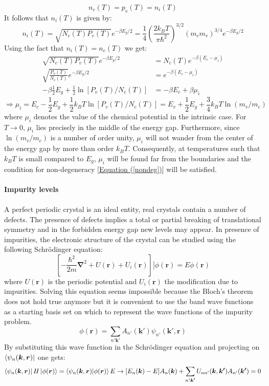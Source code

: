 \documentclass[10.75pt,a4paper,openright,bottom=2cm]{article}
\renewcommand{\Vec}[1]{\boldsymbol{#1}}
\renewcommand{\refeq}[1]{\hyperref[#1]{Equation (\ref{#1})}}
\begin{document}
\[
n_c(T)=p_v(T)=n_i(T)
\]
It follows that $n_i(T)$ is given by:
\[
n_i(T)=\sqrt{N_c(T)P_v(T)}e^{-\beta E_g/2}=\frac{1}{4}\left(\frac{2k_BT}{\pi\hbar^2}\right)^{3/2}(m_cm_v)^{3/4}e^{-\beta E_g/2}
\]
Using the fact that $n_i(T)=n_c(T)$ we get:
\[
\begin{aligned}
\sqrt{N_c(T)P_v(T)}e^{-\beta E_g/2}&=N_c(T)e^{-\beta(E_c-\mu_i)}\\
\sqrt{\frac{P_v(T)}{N_c(T)}}e^{-\beta E_g/2}&=e^{-\beta(E_c-\mu_i)}\\
-\beta \frac{1}{2}E_g+\frac{1}{2}\ln[P_v(T)/N_c(T)]&=-\beta E_c+\beta\mu_i
\end{aligned}
\]
\[
\Rightarrow\mu_i=E_c-\frac{1}{2}E_g+\frac{1}{2}k_BT\ln[P_v(T)/N_c(T)]=E_v+\frac{1}{2}E_g+\frac{3}{4}k_BT\ln(m_v/m_c)
\]
where $\mu_i$ denotes the value of the chemical potential in the intrinsic case. For $T\to0$, $\mu_i$ lies precisely in the middle of the energy gap. Furthermore, since $\ln(m_v/m_c)$ is a number of order unity, $\mu_i$ will not wander from the center of the energy gap by more than order $k_BT$. Consequently, at temperatures such that $k_BT$ is small compared to $E_g$, $\mu_i$ will be found far from the boundaries and the condition for non-degeneracy [\refeq{nondeg}] will be satisfied.\\\\
\textbf{Impurity levels}\\\\
A perfect periodic crystal is an ideal entity, real crystals contain a number of defects. The presence of defects implies a total or partial breaking of translational symmetry and in the forbidden energy gap new levels may appear. In presence of impurities, the electronic structure of the crystal can be studied using the following Schr\"odinger equation:
\[
\left[-\frac{\hbar^2}{2m}\Vec{\nabla}^2+U(\Vec{r})+U_i(\Vec{r})\right]]\phi(\Vec{r})=E\phi(\Vec{r})
\]
where $U(\Vec{r})$ is the periodic potential and $U_i(\Vec{r})$ the modification due to impurities. Solving this equation seems impossible because the Bloch's theorem does not hold true anymore but it is convenient to use the band wave functions as a starting basis set on which to represent the wave functions of the impurity problem.
\[
\phi(\Vec{r})=\sum_{n'\Vec{k'}}A_{n'}(\Vec{k'})\psi_{n'}(\Vec{k'},\Vec{r})
\]
By substituting this wave function in the Schr\"odinger equation and projecting on $\bra{\psi_n(\Vec{k},\Vec{r})}$ one gets:
\[
\bra{\psi_n(\Vec{k},\Vec{r})}H\ket{\phi(\Vec{r})}=\bra{\psi_n(\Vec{k},\Vec{r})}\ket{\phi(\Vec{r})}E\to[E_n(\Vec{k})-E]A_n(\Vec{k})+\sum_{n'\Vec{k'}}U_{nn'}(\Vec{k},\Vec{k'})A_{n'}(\Vec{k'})=0
\]
\end{document}
